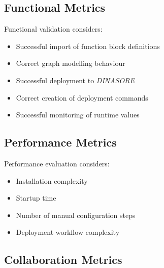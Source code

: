 



\subsection{Functional Metrics}

Functional validation considers:

\begin{itemize}
\item Successful import of function block definitions
\item Correct graph modelling behaviour
\item Successful deployment to \textit{DINASORE}
\item Correct creation of deployment commands
\item Successful monitoring of runtime values
\end{itemize}

\subsection{Performance Metrics}

Performance evaluation considers:

\begin{itemize}
\item Installation complexity
\item Startup time
\item Number of manual configuration steps
\item Deployment workflow complexity
\end{itemize}

\subsection{Collaboration Metrics}

